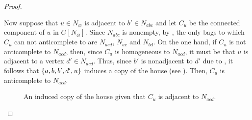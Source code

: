 \begin{proof}
\begin{enumerate}[label=(\roman*)]
            Now suppose that $u\in N_{\varnothing}$ is adjacent to $b'\in
            N_{abc}$ and let $C_u$ be the connected component of $u$ in
            $G[N_\varnothing]$. Since $N_{abc}$ is nonempty, by
            , the only bags to which $C_u$ can not anticomplete
            to are $N_{acd}$, $N_{ac}$ and $N_{bd}$. On the one hand, if $C_u$
            is not anticomplete to $N_{acd}$, then, since $C_u$ is homogeneous
            to $N_{acd}$, it must be that $u$ is adjacent to a vertex $d'\in
            N_{acd}$. Thus, since $b'$ is nonadjacent to $d'$ due to
            , it follows that $\left\{a,b,b',d',u\right\}$ induces a copy
            of the house (see ). Then, $C_u$ is anticomplete
            to $N_{acd}$.

            \begin{figure}[htb!]
                \centering
                \caption{An induced copy of the house given that $C_u$ is
                    adjacent to $N_{acd}$.}
                \label{fig:type_8_2}
            \end{figure}


\end{enumerate}
\end{proof}
